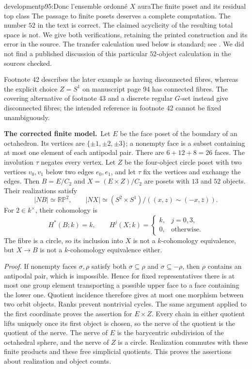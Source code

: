 \begin{dcomment}{development}{p95:Donc l'ensemble ordonné $X$ aura}{The finite poset and its residual top class}
The passage to finite posets deserves a complete computation. The number $52$ in the text is correct. The claimed acyclicity of the resulting total space is not. We give both verifications, retaining the printed construction and its error in the source. The transfer calculation used below is standard; see \citet[\S3.G]{Hatcher2002}. We did not find a published discussion of this particular $52$-object calculation in the sources checked.

Footnote 42 describes the later example as having disconnected fibres, whereas the explicit choice $Z=S^1$ on manuscript page 94 has connected fibres. The covering alternative of footnote 43 and a discrete regular $G$-set instead give disconnected fibres; the intended reference in footnote 42 cannot be fixed unambiguously.

\textbf{The corrected finite model.}\ours\
Let $E$ be the face poset of the boundary of an octahedron. Its vertices are $\{\pm1,\pm2,\pm3\}$; a nonempty face is a subset containing at most one element of each antipodal pair. There are $6+12+8=26$ faces. The involution $\tau$ negates every vertex. Let $Z$ be the four-object circle poset with two vertices $v_0,v_1$ below two edges $e_0,e_1$, and let $\tau$ fix the vertices and exchange the edges. Then $B=E/C_2$ and $X=(E\times Z)/C_2$ are posets with $13$ and $52$ objects. Their realizations satisfy
\[
 |NB|\simeq\mathbb{RP}^2,\qquad
 |NX|\simeq(S^2\times S^1)/((x,z)\sim(-x,\bar z)).
\]
For $2\in k^\times$, their cohomology is
\[
 H^*(B;k)=k,\qquad
 H^j(X;k)=\begin{cases}k,&j=0,3,\\0,&\text{otherwise}.\end{cases}
\]
The fibre is a circle, so its inclusion into $X$ is not a $k$-cohomology equivalence, but $X\to B$ is not a $k$-cohomology equivalence either.

\emph{Proof.} If nonempty faces $\sigma,\rho$ satisfy both $\sigma\subseteq\rho$ and $\sigma\subseteq-\rho$, then $\rho$ contains an antipodal pair, which is impossible. Hence for fixed representatives there is at most one group element transporting a possible upper face to a face containing the lower one. Quotient incidence therefore gives at most one morphism between two orbit objects. Ranks prevent nontrivial cycles. The same argument applied to the first coordinate proves the assertion for $E\times Z$. Every chain in either quotient lifts uniquely once its first object is chosen, so the nerve of the quotient is the quotient of the nerve. The nerve of $E$ is the barycentric subdivision of the octahedral sphere, and the nerve of $Z$ is a circle. Realization commutes with these finite products and these free simplicial quotients. This proves the assertions about realization and object counts.


\end{dcomment}
